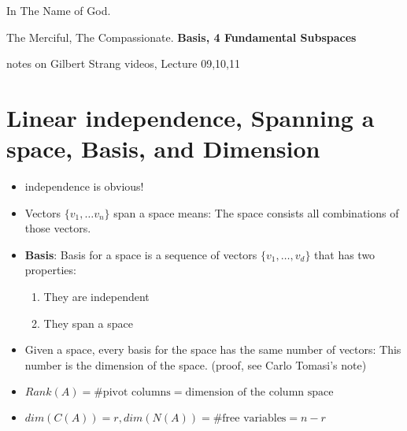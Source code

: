 \documentclass[a4paper,12pt]{article}
\begin{document}
\begin{center}
In The Name of God.

The Merciful, The Compassionate.
\vskip 1cm
{\Large\bfseries{Basis, 4 Fundamental Subspaces}}

\vskip 0.2cm
\tiny{notes on Gilbert Strang videos, Lecture 09,10,11}
\end{center}

\section{Linear independence, Spanning a space, Basis, and Dimension}
\begin{itemize}
	\item independence is obvious!
	\item Vectors $\{v_1, \ldots v_n\}$ span a space means: The space consists all combinations of those vectors.
	\item \textbf{Basis}: Basis for a space is a sequence of vectors $\{v_1, \ldots, v_d\}$ that has two properties:
		\begin{enumerate}
			\item They are independent
			\item They span a space
		\end{enumerate}
	\item Given a space, every basis for the space has the same number of vectors: This number is the dimension of the space. (proof, see Carlo Tomasi's note)
	\item $Rank(A)= \# \text{pivot columns} = \text{dimension of the column space}$
	\item $dim(C(A)) = r, dim(N(A)) = \# \text{free variables} = n - r$
\end{itemize}
\end{document}
